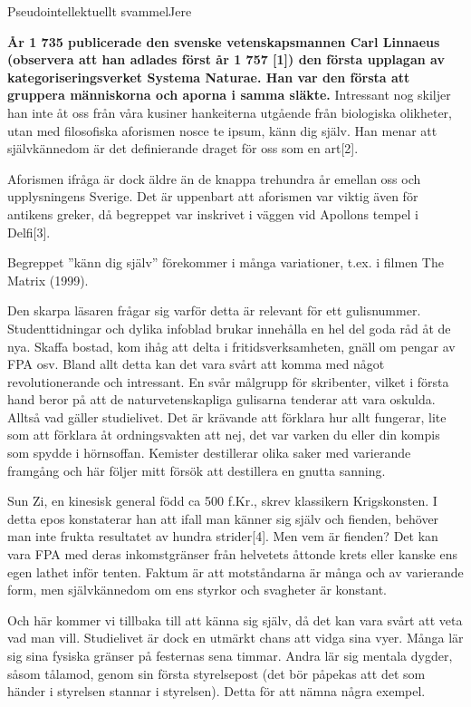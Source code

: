 \documentclass{spektraklet}
\begin{document}
\begin{artikel}{Pseudointellektuellt svammel}{Jere}

\textbf{År 1 735 publicerade den svenske vetenskapsmannen Carl Linnaeus (observera att han adlades först år 1 757 [1]) den första upplagan av kategoriseringsverket Systema
Naturae. Han var den första att gruppera människorna och aporna i samma släkte.} Intressant nog skiljer han inte åt oss från våra kusiner hankeiterna utgående från biologiska olikheter, utan med filosofiska aforismen nosce te ipsum, känn dig själv. Han menar att självkännedom är det definierande draget för oss som en art[2].

Aforismen ifråga är dock äldre än de knappa trehundra år emellan oss och upplysningens Sverige. Det är uppenbart att aforismen var viktig även för antikens greker, då begreppet var inskrivet i väggen vid Apollons tempel i Delfi[3].

Begreppet ”känn dig själv” förekommer i många variationer, t.ex. i filmen The Matrix (1999).

Den skarpa läsaren frågar sig varför detta är relevant för ett gulisnummer. Studenttidningar och dylika infoblad brukar innehålla en hel del goda råd åt de nya. Skaffa bostad, kom ihåg att delta i fritidsverksamheten, gnäll om pengar av FPA osv. Bland allt detta kan det vara svårt att komma med något revolutionerande och intressant. En svår målgrupp för skribenter, vilket i första hand beror på att de naturvetenskapliga gulisarna tenderar att vara oskulda. Alltså vad gäller studielivet. Det är krävande att förklara hur allt fungerar, lite som att förklara åt ordningsvakten att nej, det var varken du eller din kompis som spydde i hörnsoffan. Kemister destillerar olika saker med varierande framgång och här följer mitt försök att destillera en gnutta sanning.

Sun Zi, en kinesisk general född ca 500 f.Kr., skrev klassikern Krigskonsten. I detta epos konstaterar han att ifall man känner sig själv och fienden, behöver man inte frukta resultatet av hundra strider[4]. Men vem är fienden? Det kan vara FPA med deras inkomstgränser från helvetets åttonde krets eller kanske ens egen lathet inför tenten. Faktum är att motståndarna är många och av varierande form, men självkännedom om ens styrkor och svagheter är konstant.

Och här kommer vi tillbaka till att känna sig själv, då det kan vara svårt att veta vad man vill. Studielivet är dock en utmärkt chans att vidga sina vyer. Många lär sig sina fysiska gränser på festernas sena timmar. Andra lär sig mentala dygder, såsom tålamod, genom sin första styrelsepost (det bör påpekas att det som händer i styrelsen stannar i styrelsen). Detta för att nämna några exempel.


\end{artikel}
\end{document}
